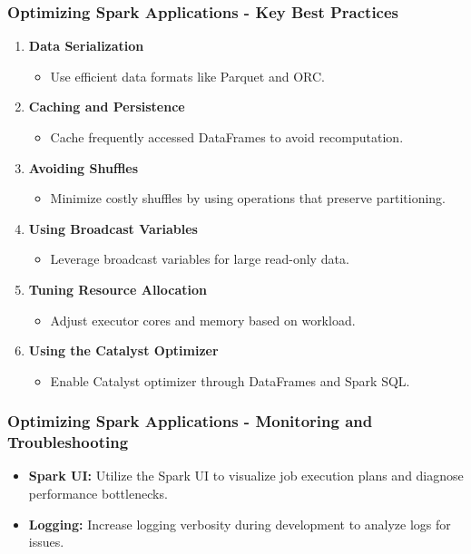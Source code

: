 \documentclass[aspectratio=169]{beamer}
\begin{document}
\begin{frame}[fragile]
  \frametitle{Optimizing Spark Applications - Key Best Practices}
  \begin{enumerate}
    \item \textbf{Data Serialization}
      \begin{itemize}
        \item Use efficient data formats like Parquet and ORC.
      \end{itemize}
    \item \textbf{Caching and Persistence}
      \begin{itemize}
        \item Cache frequently accessed DataFrames to avoid recomputation.
      \end{itemize}
    \item \textbf{Avoiding Shuffles}
      \begin{itemize}
        \item Minimize costly shuffles by using operations that preserve partitioning.
      \end{itemize}
    \item \textbf{Using Broadcast Variables}
      \begin{itemize}
        \item Leverage broadcast variables for large read-only data.
      \end{itemize}
    \item \textbf{Tuning Resource Allocation}
      \begin{itemize}
        \item Adjust executor cores and memory based on workload.
      \end{itemize}
    \item \textbf{Using the Catalyst Optimizer}
      \begin{itemize}
        \item Enable Catalyst optimizer through DataFrames and Spark SQL.
      \end{itemize}
  \end{enumerate}
\end{frame}

\begin{frame}[fragile]
  \frametitle{Optimizing Spark Applications - Monitoring and Troubleshooting}
  \begin{itemize}
    \item \textbf{Spark UI:} Utilize the Spark UI to visualize job execution plans and diagnose performance bottlenecks.
    \item \textbf{Logging:} Increase logging verbosity during development to analyze logs for issues.
  \end{itemize}
\end{frame}
\end{document}
